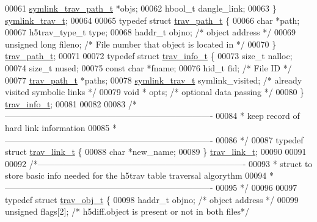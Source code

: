 \begin{DoxyCode}
00061     \hyperlink{structsymlink__trav__path__t}{symlink\_trav\_path\_t} *objs;
00062     hbool\_t dangle\_link;
00063 \} \hyperlink{structsymlink__trav__t}{symlink\_trav\_t};
00064 
00065 \textcolor{keyword}{typedef} \textcolor{keyword}{struct }\hyperlink{structtrav__path__t}{trav\_path\_t} \{
00066     \textcolor{keywordtype}{char}      *path;
00067     h5trav\_type\_t type;
00068     haddr\_t     objno;     \textcolor{comment}{/* object address */}
00069     \textcolor{keywordtype}{unsigned} \textcolor{keywordtype}{long}   fileno; \textcolor{comment}{/* File number that object is located in */}
00070 \} \hyperlink{structtrav__path__t}{trav\_path\_t};
00071 
00072 \textcolor{keyword}{typedef} \textcolor{keyword}{struct }\hyperlink{structtrav__info__t}{trav\_info\_t} \{
00073     \textcolor{keywordtype}{size\_t}      nalloc;
00074     \textcolor{keywordtype}{size\_t}      nused;
00075     \textcolor{keyword}{const} \textcolor{keywordtype}{char} *fname;
00076     hid\_t fid;                          \textcolor{comment}{/* File ID */}
00077     \hyperlink{structtrav__path__t}{trav\_path\_t} *paths;
00078     \hyperlink{structsymlink__trav__t}{symlink\_trav\_t} symlink\_visited;     \textcolor{comment}{/* already visited symbolic links */}
00079     \textcolor{keywordtype}{void} * opts;                        \textcolor{comment}{/* optional data passing */}
00080 \} \hyperlink{structtrav__info__t}{trav\_info\_t};
00081 
00082 
00083 \textcolor{comment}{/*-------------------------------------------------------------------------}
00084 \textcolor{comment}{ * keep record of hard link information}
00085 \textcolor{comment}{ *-------------------------------------------------------------------------}
00086 \textcolor{comment}{ */}
00087 \textcolor{keyword}{typedef} \textcolor{keyword}{struct }\hyperlink{structtrav__link__t}{trav\_link\_t} \{
00088     \textcolor{keywordtype}{char}      *new\_name;
00089 \} \hyperlink{structtrav__link__t}{trav\_link\_t};
00090 
00091 
00092 \textcolor{comment}{/*-------------------------------------------------------------------------}
00093 \textcolor{comment}{ * struct to store basic info needed for the h5trav table traversal algorythm}
00094 \textcolor{comment}{ *-------------------------------------------------------------------------}
00095 \textcolor{comment}{ */}
00096 
00097 \textcolor{keyword}{typedef} \textcolor{keyword}{struct }\hyperlink{structtrav__obj__t}{trav\_obj\_t} \{
00098     haddr\_t     objno;     \textcolor{comment}{/* object address */}
00099     \textcolor{keywordtype}{unsigned}    flags[2];  \textcolor{comment}{/* h5diff.object is present or not in both files*/}

\end{DoxyCode}
